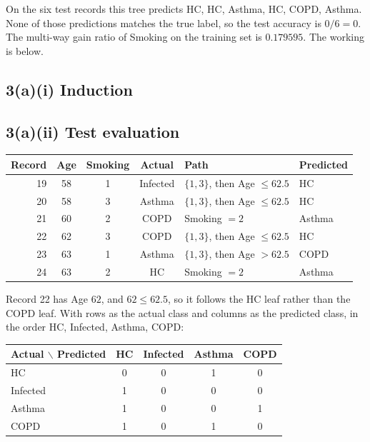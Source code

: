 \documentclass[11pt]{article}
\begin{document}
On the six test records this tree predicts HC, HC, Asthma, HC, COPD, Asthma. None of those predictions matches the true label, so the test accuracy is $0/6=0$. The multi-way gain ratio of Smoking on the training set is $0.179595$. The working is below.

\subsection*{3(a)(i) Induction}



\subsection*{3(a)(ii) Test evaluation}

\begin{center}
\small
\begin{tabular}{rcccll}
\toprule
Record & Age & Smoking & Actual & Path & Predicted \\
\midrule
19 & 58 & 1 & Infected & $\{1,3\}$, then Age $\le 62.5$ & HC \\
20 & 58 & 3 & Asthma & $\{1,3\}$, then Age $\le 62.5$ & HC \\
21 & 60 & 2 & COPD & Smoking $=2$ & Asthma \\
22 & 62 & 3 & COPD & $\{1,3\}$, then Age $\le 62.5$ & HC \\
23 & 63 & 1 & Asthma & $\{1,3\}$, then Age $>62.5$ & COPD \\
24 & 63 & 2 & HC & Smoking $=2$ & Asthma \\
\bottomrule
\end{tabular}
\end{center}

Record 22 has Age $62$, and $62\le 62.5$, so it follows the HC leaf rather than the COPD leaf. With rows as the actual class and columns as the predicted class, in the order HC, Infected, Asthma, COPD:

\begin{center}
\begin{tabular}{lcccc}
\toprule
Actual $\backslash$ Predicted & HC & Infected & Asthma & COPD \\
\midrule
HC & 0 & 0 & 1 & 0 \\
Infected & 1 & 0 & 0 & 0 \\
Asthma & 1 & 0 & 0 & 1 \\
COPD & 1 & 0 & 1 & 0 \\
\bottomrule
\end{tabular}
\end{center}
\end{document}
